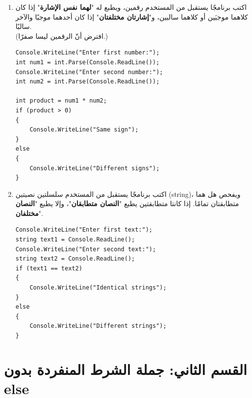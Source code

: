 \documentclass[14pt]{extarticle}
\begin{document}
\begin{enumerate}[itemsep=2em]
\filbreak
\item
اكتب برنامجًا يستقبل من المستخدم رقمين، ويطبع له "\textbf{لهما نفس الإشارة}" إذا كان كلاهما موجبَين أو كلاهما سالبين، و"\textbf{إشارتان مختلفتان}" إذا كان أحدهما موجبًا والآخر سالبًا. \\
(افترض أنّ الرقمين ليسا صفرًا.)
\ifwithsols
\begin{boxSolution}
\begin{english}
\begin{verbatim}
Console.WriteLine("Enter first number:");
int num1 = int.Parse(Console.ReadLine());
Console.WriteLine("Enter second number:");
int num2 = int.Parse(Console.ReadLine());

int product = num1 * num2;
if (product > 0)
{
    Console.WriteLine("Same sign");
}
else
{
    Console.WriteLine("Different signs");
}
\end{verbatim}
\end{english}
\end{boxSolution}
\fi

\filbreak
\item
اكتب برنامجًا يستقبل من المستخدم سلسلتين نصيتين (\textenglish{string})، ويفحص هل هما متطابقتان تمامًا. إذا كانتا متطابقتين يطبع "\textbf{النصان متطابقان}"، وإلا يطبع "\textbf{النصان مختلفان}".
\ifwithsols
\begin{boxSolution}
\begin{english}
\begin{verbatim}
Console.WriteLine("Enter first text:");
string text1 = Console.ReadLine();
Console.WriteLine("Enter second text:");
string text2 = Console.ReadLine();
if (text1 == text2)
{
    Console.WriteLine("Identical strings");
}
else
{
    Console.WriteLine("Different strings");
}
\end{verbatim}
\end{english}
\end{boxSolution}
\fi

\end{enumerate}

\clearpage
\section*{القسم الثاني: جملة الشرط المنفردة بدون \textenglish{else}}
\end{document}
